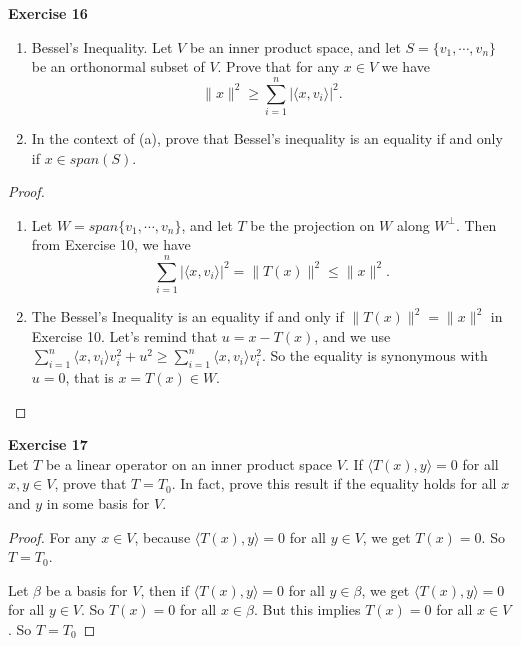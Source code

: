 \documentclass[12pt, a4paper]{article}
\theoremstyle{plain}
\newenvironment{exercise}[2][Exercise]
    { \begin{mdframed}[backgroundcolor=gray!20] \textbf{#1 #2} \\}
    {  \end{mdframed}}
\begin{document}
\begin{exercise}{16}
\begin{enumerate}[label=(\alph*)]
\item Bessel's Inequality. Let $V$ be an inner product space, and let $S=\{v_1,\cdots,v_n\}$ be an orthonormal subset of $V$. Prove that for any $x\in V$ we have
\[
\|x\|^2\geq \sum_{i=1}^{n}{|\langle{x,v_i}\rangle|^2}.
\]
\item In the context of (a), prove that Bessel's inequality is an equality if and only if $x\in span(S)$.
\end{enumerate}
\end{exercise}
\begin{proof}
\begin{enumerate}[label=(\alph*)]
	\item Let $W=span\{v_1,\cdots,v_n\}$, and let $T$ be the projection on $W$ along $W^\perp$. Then from Exercise 10, we have
	\[
	\sum_{i=1}^{n}{|\langle{x,v_i}\rangle |^2}=\|T(x)\|^2\leq \|x\|^2.
	\]
	\item The Bessel's Inequality is an equality if and only if $\|T(x)\|^2=\|x\|^2$ in Exercise 10. Let's remind that $u=x-T(x)$, and we use $\sum_{i=1}^{n}{\langle{x,v_i}\rangle v_i^2}+u^2\geq \sum_{i=1}^{n}{\langle{x,v_i}\rangle v_i^2}$. So the equality is synonymous with $u=0$, that is $x=T(x)\in W$.
\end{enumerate}
\end{proof}

\begin{exercise}{17}
Let $T$ be a linear operator on an inner product space $V$. If $\langle{T(x),y}\rangle=0$ for all $x,y\in V$, prove that $T=T_0$. In fact, prove this result if the equality holds for all $x$ and $y$ in some basis for $V$.
\end{exercise}
	\begin{proof}
	For any $x\in V$, because $\langle{T(x),y}\rangle=0$ for all $y\in V$, we get $T(x)=0$. So $T=T_0$.
	
	Let $\beta$ be a basis for $V$, then if $\langle{T(x),y}\rangle=0$ for all $y\in \beta$, we get $\langle{T(x),y}\rangle=0$ for all $y\in V$. So $T(x)=0$ for all $x\in \beta$. But this implies $T(x)=0$ for all $x\in V$. So $T=T_0$
	\end{proof}
\pagebreak
\end{document}
